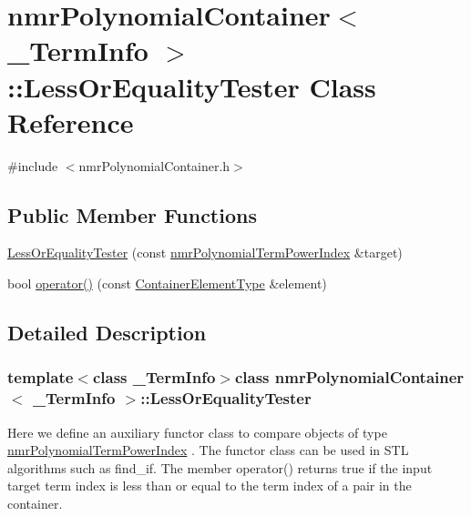 \hypertarget{classnmr_polynomial_container_1_1_less_or_equality_tester}{\section{nmr\-Polynomial\-Container$<$ \-\_\-\-Term\-Info $>$\-:\-:Less\-Or\-Equality\-Tester Class Reference}
\label{classnmr_polynomial_container_1_1_less_or_equality_tester}
}


{\ttfamily \#include $<$nmr\-Polynomial\-Container.\-h$>$}

\subsection*{Public Member Functions}
\begin{DoxyCompactItemize}
\item 
\hyperlink{classnmr_polynomial_container_1_1_less_or_equality_tester_ac5e840204fc626b9ba0918149f519022}{Less\-Or\-Equality\-Tester} (const \hyperlink{classnmr_polynomial_term_power_index}{nmr\-Polynomial\-Term\-Power\-Index} \&target)
\item 
bool \hyperlink{classnmr_polynomial_container_1_1_less_or_equality_tester_a56cdf4a012c6a98da376d4c7bd551b01}{operator()} (const \hyperlink{classnmr_polynomial_container_ae9c399b9034fb32315a644ebb103b4dd}{Container\-Element\-Type} \&element)
\end{DoxyCompactItemize}


\subsection{Detailed Description}
\subsubsection*{template$<$class \-\_\-\-Term\-Info$>$class nmr\-Polynomial\-Container$<$ \-\_\-\-Term\-Info $>$\-::\-Less\-Or\-Equality\-Tester}

Here we define an auxiliary functor class to compare objects of type \hyperlink{classnmr_polynomial_term_power_index}{nmr\-Polynomial\-Term\-Power\-Index} . The functor class can be used in S\-T\-L algorithms such as find\-\_\-if. The member operator() returns true if the input target term index is less than or equal to the term index of a pair in the container. 


